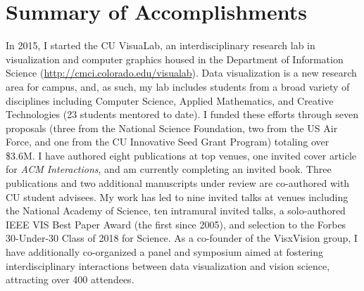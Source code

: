 \documentclass[11pt]{article}
\begin{document}

\section*{Summary of Accomplishments}

In 2015, I started the CU VisuaLab, an interdisciplinary research lab in visualization and computer graphics housed in the Department of Information Science (\href{http://cmci.colorado.edu/visualab}{http://cmci.colorado.edu/visualab}). Data visualization is a new research area for campus, and, as such, my lab includes students from a broad variety of disciplines including Computer Science, Applied Mathematics, and Creative Technologies (23 students mentored to date). I funded these efforts through seven proposals (three from the National Science Foundation, two from the US Air Force, and one from the CU Innovative Seed Grant Program) totaling over \$3.6M. 
I have authored eight publications at top venues, one invited cover article for \emph{ACM Interactions}, and am currently completing an invited book. Three publications and two additional manuscripts under review are co-authored with CU student advisees. My work has led to nine invited talks at venues including the National Academy of Science, ten intramural invited talks, a solo-authored IEEE VIS Best Paper Award (the first since 2005), and selection to the Forbes 30-Under-30 Class of 2018 for Science.  As a co-founder of the VisxVision group, I have additionally co-organized a panel and symposium aimed at fostering interdisciplinary interactions between data visualization and vision science, attracting over 400 attendees. 
\end{document}
